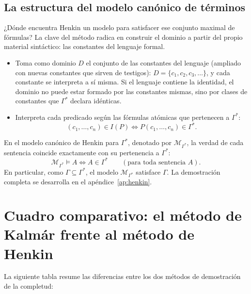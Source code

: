 \subsection{La estructura del modelo canónico de términos}
¿Dónde encuentra Henkin un modelo para satisfacer ese conjunto maximal de fórmulas? La clave del método radica en construir el dominio a partir del propio material sintáctico: las constantes del lenguaje formal.
\begin{itemize}
    \item Toma como dominio $D$ el conjunto de las constantes del lenguaje (ampliado con nuevas constantes que sirven de testigos): $D = \{c_1, c_2, c_3, \dots\}$, y cada constante se interpreta a sí misma. Si el lenguaje contiene la identidad, el dominio no puede estar formado por las constantes mismas, sino por clases de constantes que $\Gamma^*$ declara idénticas. 
    \item Interpreta cada predicado según las fórmulas atómicas que pertenecen a $\Gamma^*$:
    \[
    (c_1, \dots, c_n) \in I(P) \iff P(c_1, \dots, c_n) \in \Gamma^*.
    \]
\end{itemize}
En el modelo canónico de Henkin para $\Gamma^*$, denotado por $\mathcal{M}_{\Gamma^*}$, la verdad de cada sentencia coincide exactamente con su pertenencia a $\Gamma^*$:
\[
\mathcal{M}_{\Gamma^*} \models A \iff A \in \Gamma^* \qquad (\text{para toda sentencia } A).
\]
En particular, como $\Gamma \subseteq \Gamma^*$, el modelo $\mathcal{M}_{\Gamma^*}$ satisface $\Gamma$. La demostración completa se desarrolla en el apéndice~\ref{ap:henkin}.

\section{Cuadro comparativo: el método de Kalmár frente al método de Henkin\ampliacion}

La siguiente tabla resume las diferencias entre los dos métodos de demostración de la completud:

